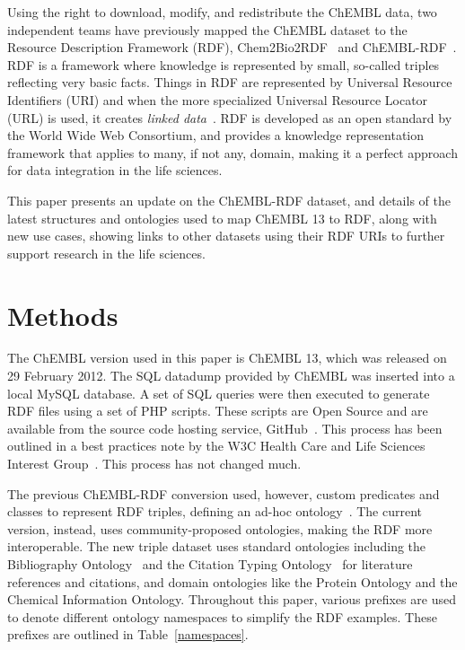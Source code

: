 \documentclass[10pt]{bmc_article}
\newenvironment{bmcformat}{\begin{raggedright}\baselineskip20pt\sloppy\setboolean{publ}{false}}{\end{raggedright}\baselineskip20pt\sloppy}
\begin{document}
\begin{bmcformat}
Using the right to download, modify, and redistribute the ChEMBL data, two independent teams
have previously mapped  the ChEMBL dataset to the Resource Description Framework (RDF),
Chem2Bio2RDF~\cite{Chen2010} and ChEMBL-RDF~\cite{Willighagen2011}. RDF is a framework where
knowledge is represented by small, so-called triples reflecting very basic facts. Things
in RDF are represented by Universal Resource Identifiers (URI) and when the more specialized
Universal Resource Locator (URL) is used, it creates \emph{linked data}~\cite{Samwald2011}. RDF is
developed as an open standard by the World Wide Web Consortium, and provides a knowledge
representation framework that applies to many, if not any, domain, making it a perfect
approach for data integration in the life sciences.

This paper presents an update on the ChEMBL-RDF dataset, and details of the latest structures
and ontologies used to map ChEMBL 13 to RDF, along with new use cases, showing 
links to other datasets using their RDF URIs to further support research in the life sciences.

\section*{Methods}
\label{s2}

The ChEMBL version used in this paper is ChEMBL 13, which was released on 29 February 2012.
The SQL datadump provided by ChEMBL was inserted into a local MySQL database. A set of SQL queries 
were then executed to generate RDF files using a set of PHP scripts. These scripts are Open Source 
and are available from the source code hosting service, GitHub~\cite{ChEMBLRDFGitHub}. This process 
has been outlined in a best practices note by the W3C Health Care and Life Sciences Interest
Group~\cite{Marshall2012}. This process has not changed much.

The previous ChEMBL-RDF conversion used, however, custom predicates and classes to represent RDF triples, defining
an ad-hoc ontology~\cite{Willighagen2011}. The current version, instead, uses community-proposed
ontologies, making the RDF more interoperable. The new triple dataset uses standard ontologies
including the Bibliography Ontology~\cite{Giasson2011} and the Citation Typing Ontology~\cite{Hastings2011} for literature
references and citations, and domain ontologies like the Protein Ontology\cite{Sidhu2006} and the Chemical Information
Ontology\cite{Hastings2011}. Throughout this paper, various prefixes are used to denote different ontology 
namespaces to simplify the RDF examples. These prefixes are outlined in Table~\ref{namespaces}.


\end{bmcformat}
\end{document}
